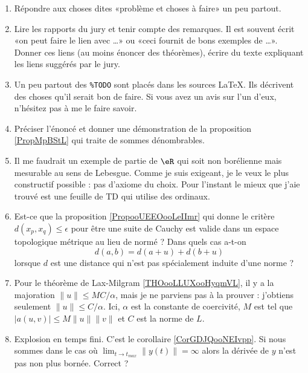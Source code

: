 \begin{enumerate}
    \item
        Répondre aux choses dites «problème et choses à faire»  un peu partout.
    \item
        Lire les rapports du jury et tenir compte des remarques. Il est souvent écrit «on peut faire le lien avec \ldots» ou «ceci fournit de bons exemples de \ldots». Donner ces liens (au moins énoncer des théorèmes), écrire du texte expliquant les liens suggérés par le jury.
    \item
        Un peu partout des \verb+%TODO+ sont placés dans les sources \LaTeX. Ils décrivent des choses qu'il serait bon de faire. Si vous avez un avis sur l'un d'eux, n'hésitez pas à me le faire savoir.
    \item
        Préciser l'énoncé et donner une démonstration de la proposition \ref{PropMpBStL} qui traite de sommes dénombrables.
    \item
        Il me faudrait un exemple de partie de \( \eR\) qui soit non borélienne mais mesurable au sens de Lebesgue. Comme je suis exigeant, je le veux le plus constructif possible : pas d'axiome du choix. Pour l'instant le mieux que j'aie trouvé est une feuille de TD\cite{XSHoosgoQa} qui utilise des ordinaux.
    \item
        Est-ce que la proposition \ref{PropooUEEOooLeIImr} qui donne le critère \( d(x_p,x_q)\leq \epsilon\) pour être une suite de Cauchy est valide dans un espace topologique métrique au lieu de normé ?  Dans quels cas a-t-on
        \begin{equation}
            d(a,b)=d(a+u)+d(b+u) 
        \end{equation}
        lorsque \( d\) est une distance qui n'est pas spécialement induite d'une norme ?
    \item
        Pour le théorème de Lax-Milgram \ref{THOooLLUXooHyqmVL}, il y a la majoration \( \| u \|\leq MC/\alpha\), mais je ne parviens pas à la prouver  : j'obtiens seulement \( \| u \|\leq C/\alpha\). Ici, \( \alpha\) est la constante de coercivité, \( M\) est tel que \( | a(u,v) |\leq M\| u \|\| v \|\) et \( C\) est la norme de \( L\).
    \item
        Explosion en temps fini. C'est le corollaire \ref{CorGDJQooNEIvpp}. Si nous sommes dans le cas où \( \lim_{t\to t_{max}} \| y(t) \|=\infty\) alors la dérivée de \( y\) n'est pas non plus bornée. Correct ?
\end{enumerate}

